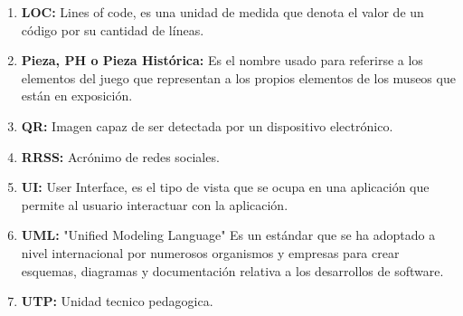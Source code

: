 \begin{enumerate}
	\item \textbf{LOC:} Lines of code, es una unidad de medida que denota el valor de un código por su cantidad de líneas.
	\item \textbf{Pieza, PH  o Pieza Histórica:} Es el nombre usado para referirse a los elementos del juego que representan a los propios elementos de los museos que están en exposición.
	\item \textbf{QR:} Imagen capaz de ser detectada por un dispositivo electrónico. 
	\item \textbf{RRSS:} Acrónimo de redes sociales.
	\item \textbf{UI:} User Interface, es el tipo de vista que se ocupa en una aplicación que permite al usuario interactuar con la aplicación.
	\item \textbf{UML:} "Unified Modeling Language" Es un estándar que se ha adoptado a nivel internacional por numerosos organismos y empresas para crear esquemas, diagramas y documentación relativa a los desarrollos de software.
	\item \textbf{UTP:} Unidad tecnico pedagogica.
\end{enumerate}















